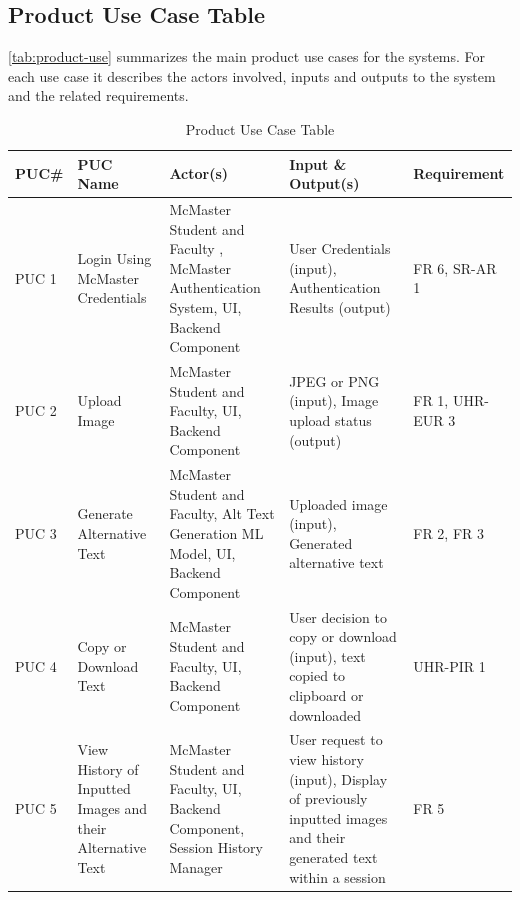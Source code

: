 \documentclass[12pt]{article}
\begin{document}
\subsection{Product Use Case Table}
\autoref{tab:product-use} summarizes the main product use cases
for the systems. For each use case it describes the actors involved,
inputs and outputs to the system and the related requirements.
\begin{table}[H]
  \centering
  \caption{Product Use Case Table}
  \label{tab:product-use}
  \begin{tabular}{|p{1.3cm}|p{2.5cm}|p{3.5cm}|p{4cm}|p{2.6cm}|}
    \hline
    \textbf{PUC\#} & \textbf{PUC Name} & \textbf{Actor(s)} &
    \textbf{Input \& Output(s)} & \textbf{Requirement} \\
    \hline
    PUC 1 & Login Using McMaster Credentials &  McMaster Student and
    Faculty , McMaster Authentication System, UI, Backend Component & User Credentials
    (input), Authentication Results (output) & FR 6, SR-AR 1\\
    \hline
    PUC 2 & Upload Image & McMaster Student and Faculty, UI, Backend Component & JPEG or PNG
    (input), Image upload status (output) & FR 1, UHR-EUR 3 \\
    \hline
    PUC 3 & Generate Alternative Text &  McMaster Student and
    Faculty, Alt Text Generation ML Model, UI, Backend Component & Uploaded image
    (input), Generated alternative text  & FR 2, FR 3\\
    \hline
    PUC 4 & Copy or Download Text & McMaster Student and Faculty, UI, Backend Component &
    User decision to copy or download (input), text copied to
    clipboard or downloaded & UHR-PIR 1\\
    \hline
    PUC 5 & View History of Inputted Images and their Alternative
    Text& McMaster Student and Faculty, UI, Backend Component, Session History Manager & User request to view
    history (input), Display of previously inputted images and their
    generated text within a session & FR 5\\
    \hline
  \end{tabular}
\end{table}
\end{document}
